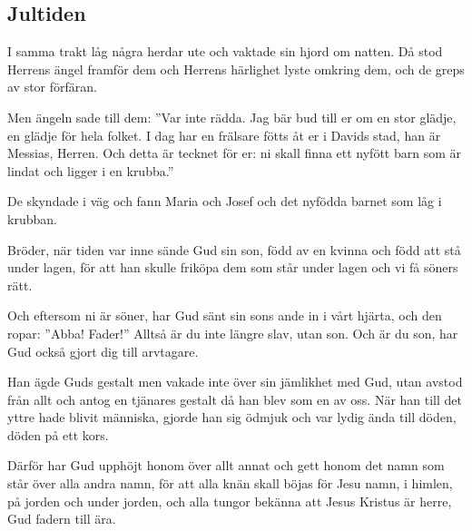 \subsection{Jultiden}


{I samma trakt låg några herdar ute och vaktade sin hjord om natten. 
 Då stod Herrens ängel framför dem och Herrens härlighet lyste omkring dem, och de greps av stor förfäran. 
 
 Men ängeln sade till dem: ”Var inte rädda. Jag bär bud till er om en stor glädje, en glädje för hela folket. 
 I dag har en frälsare fötts åt er i Davids stad, han är Messias, Herren. 
 Och detta är tecknet för er: ni skall finna ett nyfött barn som är lindat och ligger i en krubba.” 
 
 De skyndade i väg och fann Maria och Josef och det nyfödda barnet som låg i krubban.}

{Bröder, när tiden var inne sände Gud sin son, född av en kvinna och född att stå under lagen, 
 för att han skulle friköpa dem som står under lagen och vi få söners rätt. 
 
 Och eftersom ni är söner, har Gud sänt sin sons ande in i vårt hjärta, och den ropar: ”Abba! Fader!” 
 Alltså är du inte längre slav, utan son. Och är du son, har Gud också gjort dig till arvtagare.}


{Han ägde Guds gestalt men vakade inte över sin jämlikhet med Gud, 
 utan avstod från allt och antog en tjänares gestalt då han blev som en av oss. När han till det yttre hade blivit människa, 
 gjorde han sig ödmjuk och var lydig ända till döden, döden på ett kors. 
 
 Därför har Gud upphöjt honom över allt annat och gett honom det namn som står över alla andra namn, 
 för att alla knän skall böjas för Jesu namn, i himlen, på jorden och under jorden, 
 och alla tungor bekänna att Jesus Kristus är herre, Gud fadern till ära.}




